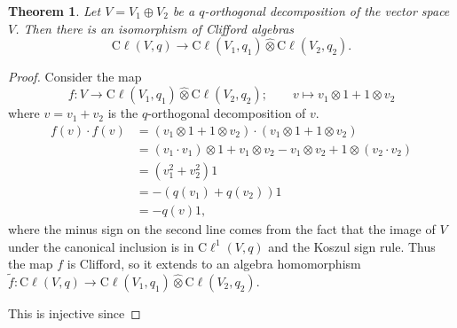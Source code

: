\documentclass[a4paper]{report}
\newcommand{\cliff}{\mathrm{C}\ell}
\theoremstyle{definition}
\theoremstyle{plain}
\newtheorem{theorem}{Theorem}[section]
\theoremstyle{remark}
\begin{document}
\begin{theorem}
  Let $V = V_{1} \oplus V_{2}$ be a $q$-orthogonal decomposition of the vector space $V$. Then there is an isomorphism of Clifford algebras
  \begin{equation*}
    \cliff(V,q) \to \cliff(V_{1}, q_{1}) \hat{\otimes} \cliff(V_{2}, q_{2}).
  \end{equation*}
\end{theorem}
\begin{proof}
  Consider the map 
  \begin{equation*}
    f\colon V \to \cliff(V_{1}, q_{1}) \hat{\otimes} \cliff(V_{2}, q_{2});\qquad v \mapsto v_{1} \otimes 1 + 1 \otimes v_{2}
  \end{equation*}
  where $v = v_{1} + v_{2}$ is the $q$-orthogonal decomposition of $v$.
  \begin{align*}
    f(v) \cdot f(v) &= \left(  v_{1} \otimes 1 + 1 \otimes v_{2}\right)\cdot\left( v_{1} \otimes 1 + 1 \otimes v_{2} \right) \\
    &= (v_{1} \cdot v_{1}) \otimes 1 + v_{1} \otimes v_{2} - v_{1} \otimes v_{2} + 1 \otimes (v_{2} \cdot v_{2}) \\
    &= (v_{1}^{2} + v_{2}^{2})1 \\
    &= -(q(v_{1}) + q(v_{2}))1 \\
    &= -q(v) 1,
  \end{align*}
  where the minus sign on the second line comes from the fact that the image of $V$ under the canonical inclusion is in $\cliff^{1}(V,q)$ and the Koszul sign rule. Thus the map $f$ is Clifford, so it extends to an algebra homomorphism $\tilde{f}\colon \cliff(V, q) \to \cliff(V_{1}, q_{1}) \hat{\otimes} \cliff(V_{2}, q_{2})$.

  This is injective since
\end{proof}
\end{document}
